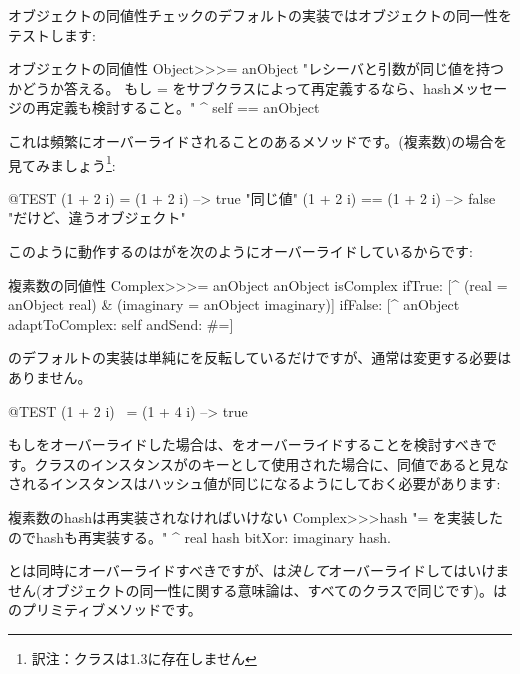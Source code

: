 \documentclass[a4paper,10pt,twoside]{book}
\begin{document}
オブジェクトの同値性チェックのデフォルトの実装ではオブジェクトの同一性をテストします:
\begin{method}{オブジェクトの同値性}
Object>>>= anObject
    "レシーバと引数が同じ値を持つかどうか答える。
    もし = をサブクラスによって再定義するなら、hashメッセージの再定義も検討すること。"
    ^ self == anObject
\end{method}

これは頻繁にオーバーライドされることのあるメソッドです。(複素数)の場合を見てみましょう\footnote{訳注：クラスは\pharo 1.3に存在しません}:

\begin{code}{@TEST}
(1 + 2 i) = (1 + 2 i)   --> true     "同じ値"
(1 + 2 i) == (1 + 2 i) --> false    "だけど、違うオブジェクト"
\end{code}

このように動作するのはが\ct{=}を次のようにオーバーライドしているからです:
\begin{method}{複素数の同値性}
Complex>>>= anObject
    anObject isComplex
        ifTrue: [^ (real = anObject real) & (imaginary = anObject imaginary)]
        ifFalse: [^ anObject adaptToComplex: self andSend: #=]
\end{method}

のデフォルトの実装は単純にを反転しているだけですが、通常は変更する必要はありません。

\begin{code}{@TEST}
(1 + 2 i) ~= (1 + 4 i) --> true
\end{code}

もし\ct{=}をオーバーライドした場合は、をオーバーライドすることを検討すべきです。クラスのインスタンスがのキーとして使用された場合に、同値であると見なされるインスタンスはハッシュ値が同じになるようにしておく必要があります:
\begin{method}{複素数のhashは再実装されなければいけない}
Complex>>>hash
    "= を実装したのでhashも再実装する。"
    ^ real hash bitXor: imaginary hash.
\end{method}

\ct{=}とは同時にオーバーライドすべきですが、\ct{==}は\emph{決して}オーバーライドしてはいけません(オブジェクトの同一性に関する意味論は、すべてのクラスで同じです)。\ct{==}はのプリミティブメソッドです。
\end{document}
